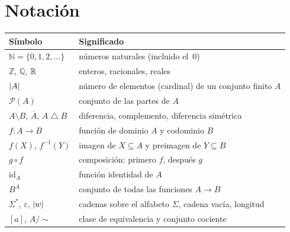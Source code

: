 \documentclass[11pt,a4paper,twoside,openany]{book}
\newcommand{\N}{\mathbb{N}}
\newcommand{\Z}{\mathbb{Z}}
\newcommand{\Q}{\mathbb{Q}}
\newcommand{\Pa}{\mathcal{P}}
\newcommand{\id}{\mathrm{id}}
\newcommand{\vacia}{\varepsilon}
\newcommand{\dsim}{\mathbin{\triangle}}
\begin{document}
\section*{Notación}
\begin{center}
\begin{tabular}{@{}ll@{}}
\toprule
Símbolo & Significado \\
\midrule
$\N=\{0,1,2,\dots\}$ & números naturales (incluido el~0) \\
$\Z$, $\Q$, $\mathbb{R}$ & enteros, racionales, reales \\
$\lvert A\rvert$ & número de elementos (cardinal) de un conjunto finito $A$ \\
$\Pa(A)$ & conjunto de las partes de $A$ \\
$A\setminus B$, $\overline{A}$, $A\dsim B$ & diferencia, complemento, diferencia simétrica \\
$f\colon A\to B$ & función de dominio $A$ y codominio $B$ \\
$f(X)$, $f^{-1}(Y)$ & imagen de $X\subseteq A$ y preimagen de $Y\subseteq B$ \\
$g\circ f$ & composición: primero $f$, después $g$ \\
$\id_A$ & función identidad de $A$ \\
$B^{A}$ & conjunto de todas las funciones $A\to B$ \\
$\Sigma^{*}$, $\vacia$, $\lvert w\rvert$ & cadenas sobre el alfabeto $\Sigma$, cadena vacía, longitud \\
$[a]$, $A/{\sim}$ & clase de equivalencia y conjunto cociente \\
\bottomrule
\end{tabular}
\end{center}


\tableofcontents

\mainmatter







\backmatter

\end{document}
